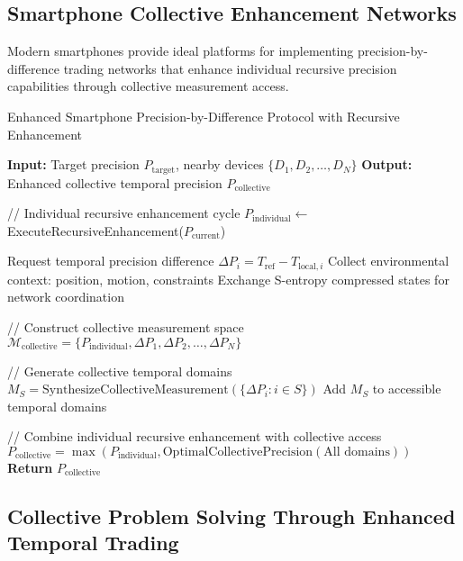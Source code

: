 \documentclass[12pt,a4paper]{article}
\begin{document}
\subsection{Smartphone Collective Enhancement Networks}

Modern smartphones provide ideal platforms for implementing precision-by-difference trading networks that enhance individual recursive precision capabilities through collective measurement access.

\begin{algorithm}
\caption{Enhanced Smartphone Precision-by-Difference Protocol with Recursive Enhancement}
\begin{algorithmic}
\State \textbf{Input:} Target precision $P_{\text{target}}$, nearby devices $\{D_1, D_2, \ldots, D_N\}$
\State \textbf{Output:} Enhanced collective temporal precision $P_{\text{collective}}$

\State // Individual recursive enhancement cycle
\State $P_{\text{individual}} \leftarrow$ ExecuteRecursiveEnhancement($P_{\text{current}}$)

    \State Request temporal precision difference $\Delta P_i = T_{\text{ref}} - T_{\text{local},i}$
    \State Collect environmental context: position, motion, constraints
    \State Exchange S-entropy compressed states for network coordination
\EndFor

\State // Construct collective measurement space
\State $\mathcal{M}_{\text{collective}} = \{P_{\text{individual}}, \Delta P_1, \Delta P_2, \ldots, \Delta P_N\}$

\State // Generate collective temporal domains
        \State $M_S = \text{SynthesizeCollectiveMeasurement}(\{\Delta P_i : i \in S\})$
        \State Add $M_S$ to accessible temporal domains
    \EndFor
\EndFor

\State // Combine individual recursive enhancement with collective access
\State $P_{\text{collective}} = \max(P_{\text{individual}}, \text{OptimalCollectivePrecision}(\text{All domains}))$
\State \textbf{Return} $P_{\text{collective}}$
\end{algorithmic}
\end{algorithm}

\subsection{Collective Problem Solving Through Enhanced Temporal Trading}
\end{document}
